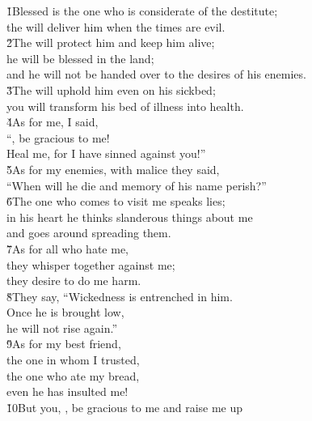 \begin{poetry}
\poeml \v{1}Blessed is the one who is considerate of the destitute; \\
\poemll    the  will deliver him when the times are evil. \\
\poeml \v{2}The  will protect him and keep him alive; \\
\poemll    he will be blessed in the land; \\
\poemlll       and he will not be handed over to the desires of his enemies. \\
\poeml \v{3}The  will uphold him even on his sickbed; \\
\poemll    you will transform his bed of illness into health. \\
\poeml \v{4}As for me, I said, \\
\poemll    ``, be gracious to me! \\
\poemlll       Heal me, for I have sinned against you!'' \\
\poeml \v{5}As for my enemies, with malice they said, \\
\poemll    ``When will he die and memory of his name perish?'' \\
\poeml \v{6}The one who comes to visit me speaks lies; \\
\poemll    in his heart he thinks slanderous things about me \\
\poemlll       and goes around spreading them. \\
\poeml \v{7}As for all who hate me, \\
\poemll    they whisper together against me; \\
\poemlll       they desire to do me harm. \\
\poeml \v{8}They say, ``Wickedness is entrenched in him. \\
\poemll    Once he is brought low, \\
\poemlll       he will not rise again.'' \\
\poeml \v{9}As for my best friend, \\
\poemll    the one in whom I trusted, \\
\poeml the one who ate my bread, \\
\poemll    even he has insulted me! \\
\poeml \v{10}But you, , be gracious to me and raise me up \\

\end{poetry}
